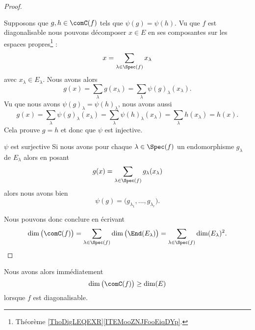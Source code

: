 \begin{proof}
\begin{subproof}
        Supposons que \( g,h\in\comC(f)\) tels que \( \psi(g)=\psi(h)\). Vu que \( f\) est diagonalisable nous pouvons décomposer \( x\in  E\) en ses composantes sur les espaces propres\footnote{Théorème \ref{ThoDigLEQEXR}\ref{ITEMooZNJFooEiqDYp}.} :
        \begin{equation}
            x=\sum_{\lambda\in\Spec(f)}x_{\lambda}
        \end{equation}
        avec \( x_{\lambda}\in E_{\lambda}\).  Nous avons alors
        \begin{equation}
            g(x)=\sum_{\lambda}g(x_{\lambda})=\sum_{\lambda}\psi(g)_{\lambda}(x_{\lambda}).
        \end{equation}
        Vu que nous avons \( \psi(g)_{\lambda}=\psi(h)_{\lambda}\), nous avons aussi
        \begin{equation}
            g(x)=\sum_{\lambda}\psi(g)_{\lambda}(x_{\lambda})=\sum_{\lambda}\psi(h)_{\lambda}(x_{\lambda})=\sum_{\lambda}h(x_{\lambda})=h(x).
        \end{equation}
        Cela prouve \( g=h\) et donc que \( \psi\) est injective.
    \item[\( \psi\) est surjective]
        Si nous avons pour chaque \( \lambda\in\Spec(f)\) un endomorphisme \( g_{\lambda}\) de \( E_{\lambda}\) alors en posant
        \begin{equation}
            g(x)=\sum_{\lambda\in\Spec(f)}g_{\lambda}(x_{\lambda})
        \end{equation}
        alors nous avons bien
        \begin{equation}
            \psi(g)=\big( g_{\lambda_1},\ldots, g_{\lambda_r} \big).
        \end{equation}
    \end{subproof}
    Nous pouvons donc conclure en écrivant
    \begin{equation}
        \dim\big( \comC(f) \big)=\sum_{\lambda\in\Spec(f)}\dim\big( \End(E_{\lambda}) \big)= \sum_{\lambda\in\Spec(f)}\dim(E_{\lambda})^2.
    \end{equation}
\end{proof}

\begin{remark}      \label{REMooUGFQooVzCOvV}
    Nous avons alors immédiatement
    \begin{equation}
        \dim\big( \comC(f) \big)\geq\dim(E)
    \end{equation}
    lorsque \( f\) est diagonalisable.
\end{remark}

